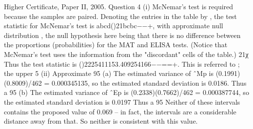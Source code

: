 Higher Certificate, Paper II, 2005. Question 4
(i) McNemar's test is required because the samples are paired.
Denoting the entries in the table by , the test statistic for McNemar's test is abcd()21bcbc−−+, with approximate null distribution , the null hypothesis here being that there is no difference between the proportions (probabilities) for the MAT and ELISA tests. (Notice that McNemar's test uses the information from the "discordant" cells of the table.) 21χ
Thus the test statistic is ()2225411153.409254166−−==+. This is referred to ; the upper 5%
(ii) Approximate 95%
(a) The estimated variance of ˆMp is (0.1991)(0.8009)/462 = 0.000345135, so the estimated standard deviation is 0.0186. Thus a 95%
(b) The estimated variance of ˆEp is (0.2338)(0.7662)/462 = 0.000387744, so the estimated standard deviation is 0.0197 Thus a 95%
Neither of these intervals contains the proposed value of 0.069 – in fact, the intervals are a considerable distance away from that. So neither is consistent with this value.
